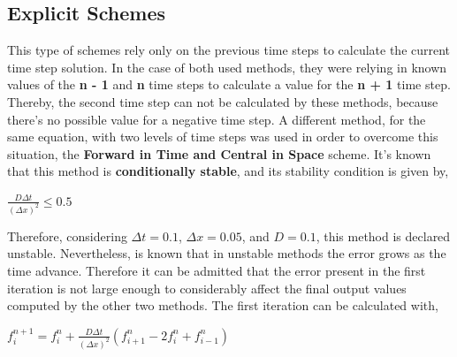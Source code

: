 \documentclass[12pt]{report}
\begin{document}
\subsection*{Explicit Schemes}

\par This type of schemes rely only on the previous time steps to calculate the current time step solution. In the case of both used methods, they were relying in known values of the \textbf{n - 1} and \textbf{n} time steps to calculate a value for the \textbf{n + 1} time step. Thereby, the second time step can not be calculated by these methods, because there's no possible value for a negative time step. A different method, for the same equation, with two levels of time steps was used in order to overcome this situation, the \textbf{Forward in Time and Central in Space} scheme. It's known that this method is \textbf{conditionally stable}, and its stability condition is given by,

\begin{center}
\Large
$
\frac{D \Delta t}{(\Delta x)^2} \leq 0.5
$
\end{center}

Therefore, considering $\Delta t = 0.1$, $\Delta x = 0.05$, and $D = 0.1$, this method is declared unstable. Nevertheless, is known that in unstable methods the error grows as the time advance. Therefore it can be admitted that the error present in the first iteration is not large enough to considerably affect the final output values computed by the other two methods. The first iteration can be calculated with,

\begin{center}
\Large
$
f_{i}^{n + 1} = f_{i}^{n} + \frac{D \Delta t}{(\Delta x)^2}(f_{i + 1}^{n} - 2f_{i}^{n} + f_{i - 1}^{n})
$
\end{center}
\end{document}
